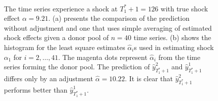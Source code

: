 \documentclass[11pt]{article}
\theoremstyle{definition}
\begin{document}


\begin{figure}[H]
  \begin{center}
    \\
  \end{center}
     \caption{The time series experience a shock at $T_1^*+1=126$ with true shock effect $\alpha = 9.21$. (a) presents the comparison of the prediction without adjustment and one that uses simple averaging of estimated shock effects given a donor pool of $n=40$ time series. (b) shows the histogram for the least square estimates $\hat{\alpha}_i$s used in estimating shock $\alpha_1$ for $i = 2, \ldots, 41$.  The magenta dots represent $\hat{\alpha}_i$ from the time series forming the donor pool. The prediction of $\hat{y}^{2}_{T_1^*+1}$ and $\hat{y}^{1}_{T_1^*+1}$ differs only by an adjustment $\hat{\alpha}=10.22$. It is clear that $\hat{y}^{2}_{T_1^*+1}$ performs better than $\hat{y}^{1}_{T_1^*+1}$.}\label{figure1}
\end{figure}
\end{document}
